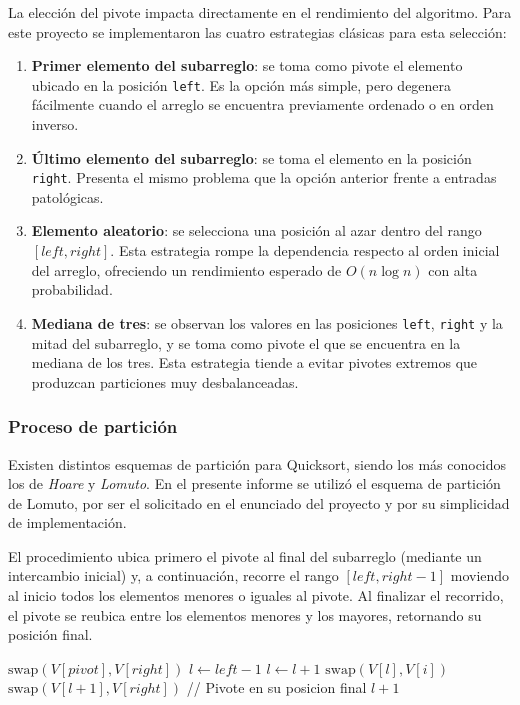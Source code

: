 La elección del pivote impacta directamente en el rendimiento del algoritmo. Para este proyecto se implementaron las cuatro estrategias clásicas para esta selección:

\begin{enumerate}
    \item \textbf{Primer elemento del subarreglo}: se toma como pivote el elemento ubicado en la posición \texttt{left}. Es la opción más simple, pero degenera fácilmente cuando el arreglo se encuentra previamente ordenado o en orden inverso.
    \item \textbf{Último elemento del subarreglo}: se toma el elemento en la posición \texttt{right}. Presenta el mismo problema que la opción anterior frente a entradas patológicas.
    \item \textbf{Elemento aleatorio}: se selecciona una posición al azar dentro del rango $[left, right]$. Esta estrategia rompe la dependencia respecto al orden inicial del arreglo, ofreciendo un rendimiento esperado de $O(n \log n)$ con alta probabilidad.
    \item \textbf{Mediana de tres}: se observan los valores en las posiciones \texttt{left}, \texttt{right} y la mitad del subarreglo, y se toma como pivote el que se encuentra en la mediana de los tres. Esta estrategia tiende a evitar pivotes extremos que produzcan particiones muy desbalanceadas.
\end{enumerate}

\subsubsection{Proceso de partición}\label{sec:lomuto}

Existen distintos esquemas de partición para Quicksort, siendo los más conocidos los de \textit{Hoare} y \textit{Lomuto}. En el presente informe se utilizó el esquema de partición de Lomuto, por ser el solicitado en el enunciado del proyecto y por su simplicidad de implementación.

El procedimiento ubica primero el pivote al final del subarreglo (mediante un intercambio inicial) y, a continuación, recorre el rango $[left, right-1]$ moviendo al inicio todos los elementos menores o iguales al pivote. Al finalizar el recorrido, el pivote se reubica entre los elementos menores y los mayores, retornando su posición final.

\begin{algorithm}
    \caption{Partición de Lomuto $\triangleright$ $V[0..n-1]$}
    \begin{algorithmic}[1]
        \State $\text{swap}(V[pivot], V[right])$
        \State $l \gets left - 1$
        \State $l \gets l + 1$
        \State $\text{swap}(V[l], V[i])$
        \EndIf
        \EndFor
        \State $\text{swap}(V[l+1], V[right])$ // Pivote en su posicion final
        \State \Return $l + 1$
        \EndProcedure
    \end{algorithmic}
\end{algorithm}

